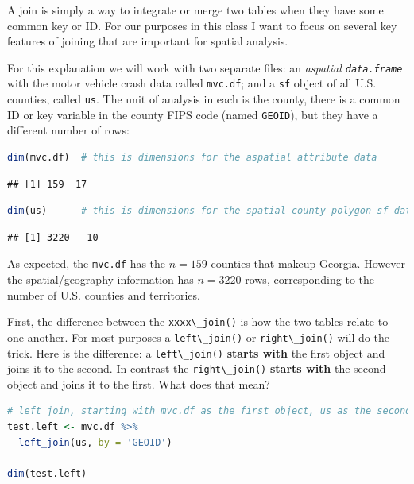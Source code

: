 \documentclass[
]{book}
\newcommand{\passthrough}[1]{#1}
\begin{document}
A join is simply a way to integrate or merge two tables when they have some common key or ID. For our purposes in this class I want to focus on several key features of joining that are important for spatial analysis.

For this explanation we will work with two separate files: an \emph{aspatial \passthrough{\lstinline!data.frame!}} with the motor vehicle crash data called \passthrough{\lstinline!mvc.df!}; and a \passthrough{\lstinline!sf!} object of all U.S. counties, called \passthrough{\lstinline!us!}. The unit of analysis in each is the county, there is a common ID or key variable in the county FIPS code (named \passthrough{\lstinline!GEOID!}), but they have a different number of rows:

\begin{lstlisting}[language=R]
dim(mvc.df)  # this is dimensions for the aspatial attribute data
\end{lstlisting}

\begin{lstlisting}
## [1] 159  17
\end{lstlisting}

\begin{lstlisting}[language=R]
dim(us)      # this is dimensions for the spatial county polygon sf data
\end{lstlisting}

\begin{lstlisting}
## [1] 3220   10
\end{lstlisting}

As expected, the \passthrough{\lstinline!mvc.df!} has the \(n=159\) counties that makeup Georgia. However the spatial/geography information has \(n=3220\) rows, corresponding to the number of U.S. counties and territories.

First, the difference between the \passthrough{\lstinline!xxxx\_join()!} is how the two tables relate to one another. For most purposes a \passthrough{\lstinline!left\_join()!} or \passthrough{\lstinline!right\_join()!} will do the trick. Here is the difference: a \passthrough{\lstinline!left\_join()!} \textbf{starts with} the first object and joins it to the second. In contrast the \passthrough{\lstinline!right\_join()!} \textbf{starts with} the second object and joins it to the first. What does that mean?

\begin{lstlisting}[language=R]
# left join, starting with mvc.df as the first object, us as the second
test.left <- mvc.df %>%
  left_join(us, by = 'GEOID')

dim(test.left)
\end{lstlisting}
\end{document}

